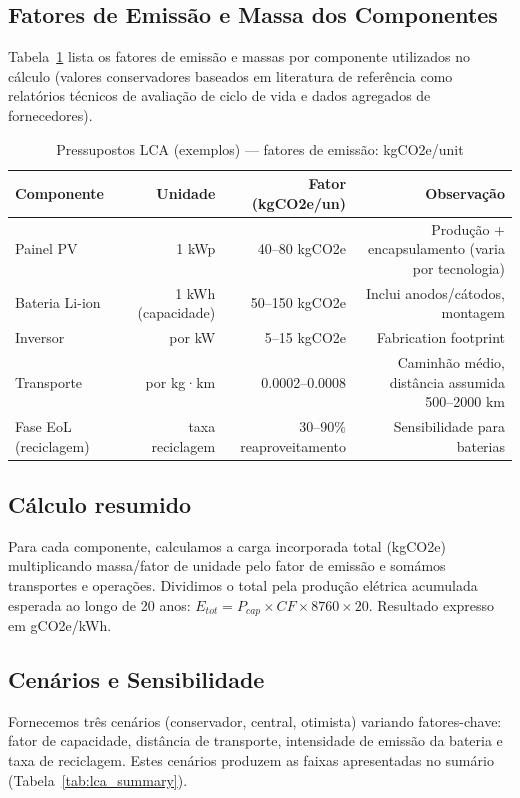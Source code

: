 \documentclass[12pt, a4paper]{article}
\begin{document}
{{{{{{{{{{{{\subsection{Fatores de Emissão e Massa dos Componentes}
Tabela~\ref{tab:lca_assumptions} lista os fatores de emissão e massas por componente
utilizados no cálculo (valores conservadores baseados em literatura de referência como
relatórios técnicos de avaliação de ciclo de vida e dados agregados de fornecedores).

\begin{table}[H]
\centering
\caption{Pressupostos LCA (exemplos) — fatores de emissão: kgCO2e/unit}
\label{tab:lca_assumptions}
\footnotesize
\begin{tabular}{@{}lrrr@{}}
\toprule
\textbf{Componente} & \textbf{Unidade} & \textbf{Fator (kgCO2e/un)} & \textbf{Observação} \\
\midrule
Painel PV & 1 kWp & 40--80 kgCO2e & Produção + encapsulamento (varia por tecnologia) \\
Bateria Li-ion & 1 kWh (capacidade) & 50--150 kgCO2e & Inclui anodos/cátodos, montagem \\
Inversor & por kW & 5--15 kgCO2e & Fabrication footprint \\
Transporte & por kg·km & 0.0002--0.0008 & Caminhão médio, distância assumida 500--2000 km \\
Fase EoL (reciclagem) & taxa reciclagem & 30--90\% reaproveitamento & Sensibilidade para baterias \\
\bottomrule
\end{tabular}
\end{table}

\subsection{Cálculo resumido}
Para cada componente, calculamos a carga incorporada total (kgCO2e) multiplicando massa/fator
de unidade pelo fator de emissão e somámos transportes e operações. Dividimos o total pela
produção elétrica acumulada esperada ao longo de 20 anos: $E_{tot}=P_{cap}\times CF\times 8760\times 20$.
Resultado expresso em gCO2e/kWh.

\subsection{Cenários e Sensibilidade}
Fornecemos três cenários (conservador, central, otimista) variando fatores-chave: fator de
capacidade, distância de transporte, intensidade de emissão da bateria e taxa de reciclagem.
Estes cenários produzem as faixas apresentadas no sumário (Tabela~\ref{tab:lca_summary}).

}}}}}}}}}}}}
\end{document}

